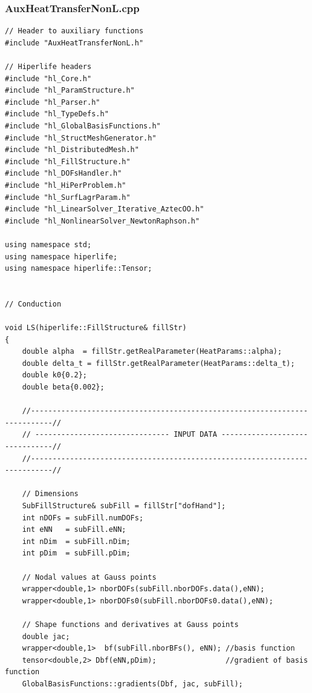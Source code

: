\documentclass[]{article}
\begin{document}
\subsubsection{AuxHeatTransferNonL.cpp} \label{sec: a.cpp}
\begin{lstlisting}
// Header to auxiliary functions
#include "AuxHeatTransferNonL.h"

// Hiperlife headers
#include "hl_Core.h"
#include "hl_ParamStructure.h"
#include "hl_Parser.h"
#include "hl_TypeDefs.h"                                                                         
#include "hl_GlobalBasisFunctions.h"                             
#include "hl_StructMeshGenerator.h"                                                                             
#include "hl_DistributedMesh.h"                                           
#include "hl_FillStructure.h"                                             
#include "hl_DOFsHandler.h"          
#include "hl_HiPerProblem.h"
#include "hl_SurfLagrParam.h"    
#include "hl_LinearSolver_Iterative_AztecOO.h"
#include "hl_NonlinearSolver_NewtonRaphson.h"

using namespace std;
using namespace hiperlife;
using namespace hiperlife::Tensor;


// Conduction

void LS(hiperlife::FillStructure& fillStr)
{
	double alpha  = fillStr.getRealParameter(HeatParams::alpha);
	double delta_t = fillStr.getRealParameter(HeatParams::delta_t);
	double k0{0.2};
	double beta{0.002};
	
	//---------------------------------------------------------------------------//
	// ------------------------------- INPUT DATA -------------------------------//
	//---------------------------------------------------------------------------//
	
	// Dimensions
	SubFillStructure& subFill = fillStr["dofHand"];
	int nDOFs = subFill.numDOFs;                                        
	int eNN   = subFill.eNN;                                           
	int nDim  = subFill.nDim;                                        
	int pDim  = subFill.pDim;
	
	// Nodal values at Gauss points
	wrapper<double,1> nborDOFs(subFill.nborDOFs.data(),eNN);
	wrapper<double,1> nborDOFs0(subFill.nborDOFs0.data(),eNN);
	
	// Shape functions and derivatives at Gauss points
	double jac;
	wrapper<double,1>  bf(subFill.nborBFs(), eNN); //basis function
	tensor<double,2> Dbf(eNN,pDim);                //gradient of basis function
	GlobalBasisFunctions::gradients(Dbf, jac, subFill);
	

\end{lstlisting}
\end{document}
